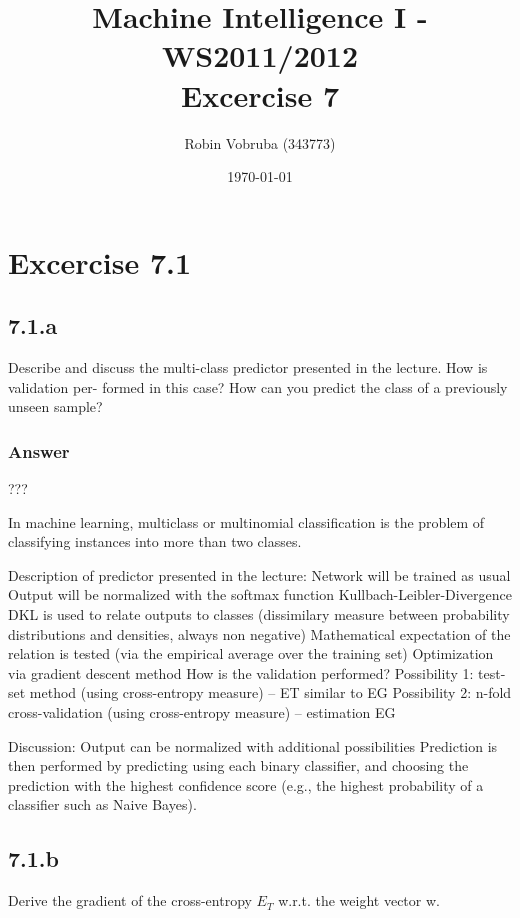 \documentclass[a4paper,headings=small]{scrartcl}
\title{Machine Intelligence I - WS2011/2012\\Excercise 7}
\author{Robin Vobruba (343773)}
\date{\today}
\begin{document}
\maketitle


\section{Excercise 7.1}

\subsection{7.1.a}
Describe and discuss the multi-class predictor presented in the lecture. How is validation per-
formed in this case? How can you predict the class of a previously unseen sample?

\subsubsection{Answer}
???

In machine learning, multiclass or multinomial classification is the problem of
classifying instances into more than two classes.

Description of predictor presented in the lecture:
Network will be trained as usual
Output will be normalized with the softmax function 
Kullbach-Leibler-Divergence DKL is used to relate outputs to classes                                                                                            (dissimilary measure between probability distributions and densities, always non negative)
Mathematical expectation of the relation is tested                                                                                       (via the empirical average over the training set)
Optimization via gradient descent method
How is the validation performed?
Possibility 1: test-set method (using cross-entropy measure) – ET similar to EG
Possibility 2: n-fold cross-validation (using cross-entropy measure) – estimation EG

Discussion:
Output can be normalized with additional possibilities
Prediction is then performed by predicting using each binary classifier, and choosing the prediction with the highest confidence score (e.g., the highest probability of a classifier such as Naive Bayes).



\subsection{7.1.b}
Derive the gradient of the cross-entropy $E_T$ w.r.t. the weight vector w.
\end{document}
